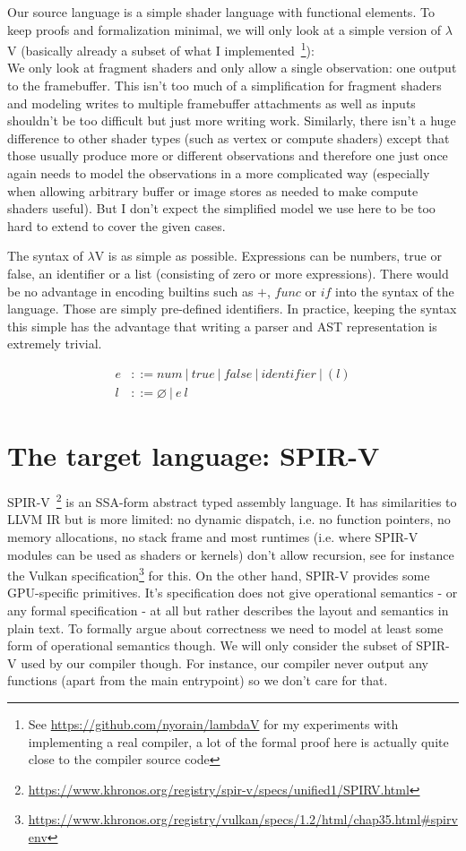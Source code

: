 \documentclass[letterpaper,12pt]{article}
\begin{document}
Our source language is a simple shader language with functional elements.
To keep proofs and formalization minimal, we will only look at a simple
version of $\lambda$V (basically already a subset of what I implemented~\footnote{See 
\url{https://github.com/nyorain/lambdaV} for my experiments with implementing
a real compiler, a lot of the formal proof here is actually quite close
to the compiler source code}): \\
We only look at fragment shaders and only allow a single observation:
one output to the framebuffer. This isn't too much of a simplification
for fragment shaders and modeling writes to multiple framebuffer attachments
as well as inputs shouldn't be too difficult but just more writing work.
Similarly, there isn't a huge difference to other shader types (such as 
vertex or compute shaders) except that those usually produce more or
different observations and therefore one just once again needs to model the
observations in a more complicated way (especially when allowing
arbitrary buffer or image stores as needed to make compute shaders
useful). But I don't expect the simplified model we use here to be too hard
to extend to cover the given cases.

The syntax of $\lambda$V is as simple as possible. Expressions
can be numbers, true or false, an identifier or a list (consisting of zero or
more expressions). There would be no advantage in encoding builtins such
as $+$, $func$ or $if$ into the syntax of the language. Those are simply
pre-defined identifiers. In practice, keeping the syntax this simple has 
the advantage that writing a parser and AST representation is extremely trivial.

\begin{align*}
	e &::= num \:|\: true \:|\: false \:|\: \textit{identifier} \:|\: (l) \\
	l &::= \varnothing \:|\: e\:l
\end{align*}


\section{The target language: SPIR-V}

SPIR-V~\footnote{\url{https://www.khronos.org/registry/spir-v/specs/unified1/SPIRV.html}}
is an SSA-form abstract typed assembly language. It has
similarities to LLVM IR but is more limited: no dynamic dispatch,
i.e. no function pointers, no memory allocations, no stack frame and
most runtimes (i.e. where SPIR-V modules can be used as shaders or
kernels) don't allow recursion, see for instance the Vulkan 
specification\footnote{\url{https://www.khronos.org/registry/vulkan/specs/1.2/html/chap35.html\#spirvenv}}
for this. On the other hand, SPIR-V provides some 
GPU-specific primitives.
It's specification does not give operational semantics - or 
any formal specification - at all but rather describes the layout 
and semantics in plain text. To formally argue about correctness we need 
to model at least some form of operational semantics though. We will
only consider the subset of SPIR-V used by our compiler though.
For instance, our compiler never output any functions (apart from the
main entrypoint) so we don't care for that.
\end{document}
